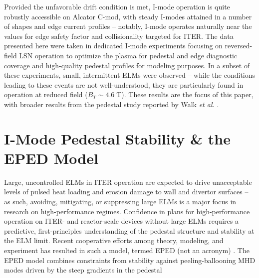 \documentclass[12pt,floatfix,showpacs]{revtex4-1}
\newcommand{\gnote}[1]{\marginpar{\textcolor{red}{\scriptsize{#1}}}}
\begin{document}
Provided the unfavorable drift condition is met, I-mode operation is quite robustly accessible on Alcator C-mod, with steady I-modes attained in a number of shapes and edge current profiles -- notably, I-mode operates naturally near the values for edge safety factor and collisionality targeted for ITER.  
The data presented here were taken in dedicated I-mode experiments focusing on reversed-field LSN operation to optimize the plasma for pedestal and edge diagnostic coverage and high-quality pedestal profiles for modeling purposes.  
In a subset of these experiments, small, intermittent ELMs were observed -- while the conditions leading to these events are not well-understood, they are particularly found in operation at reduced field ($B_T \sim 4.6 \;\mbox{T}$).  
These results are the focus of this paper, with broader results from the pedestal study reported by Walk \emph{et al.} \cite{Walk2014}.\gnote{get formatting right}

\section{I-Mode Pedestal Stability \& the EPED Model}\label{sec:model}

Large, uncontrolled ELMs in ITER operation are expected to drive unacceptable levels of pulsed heat loading and erosion damage to wall and divertor surfaces \cite{Loarte2003,Federici2003} -- as such, avoiding, mitigating, or suppressing large ELMs is a major focus in research on high-performance regimes.  Confidence in plans for high-performance operation on ITER- and reactor-scale devices without large ELMs requires a predictive, first-principles understanding of the pedestal structure and stability at the ELM limit.  Recent cooperative efforts among theory, modeling, and experiment \cite{Groebner2013} has resulted in such a model, termed EPED (not an acronym) \cite{Snyder2009,Snyder2011}.  The EPED model combines constraints from stability against peeling-ballooning MHD modes driven by the steep gradients in the pedestal
\end{document}

